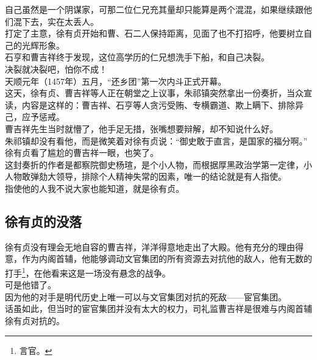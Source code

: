 \begin{multicols}{\theparacolNo}
自己虽然是一个阴谋家，可那二位仁兄充其量却只能算是两个混混，如果继续跟他们混下去，实在太丢人。\\

打定了主意，徐有贞开始和曹、石二人保持距离，见面了也不打招呼，他要树立自己的光辉形象。\\

石亨和曹吉祥终于发现，这位高学历的仁兄想洗手下船，和自己决裂。\\

决裂就决裂吧，怕你不成！\\

天顺元年（1457年）五月，“还乡团”第一次内斗正式开幕。\\

这天，徐有贞、曹吉祥等人正在朝堂之上议事，朱祁镇突然拿出一份奏折，当众宣读，内容是这样的：曹吉祥、石亨等人贪污受贿、专横霸道、欺上瞒下、排除异己，应予惩戒。\\

曹吉祥先生当时就懵了，他手足无措，张嘴想要辩解，却不知说什么好。\\

朱祁镇却没有看他，而是微笑着对徐有贞说：“御史敢于直言，是国家的福分啊。”\\

徐有贞看了尴尬的曹吉祥一眼，也笑了。\\

这封奏折的作者是都察院御史杨瑄，是个小人物，而根据厚黑政治学第一定律，小人物敢弹劾大领导，排除个人精神失常的因素，唯一的结论就是有人指使。\\

指使他的人我不说大家也能知道，就是徐有贞。\\

\subsection{徐有贞的没落}
徐有贞没有理会无地自容的曹吉祥，洋洋得意地走出了大殿。他有充分的理由得意，作为内阁首辅，他能够调动文官集团的所有资源去对抗他的敌人，他有无数的打手\footnote{言官。}，在他看来这是一场没有悬念的战争。\\

可是他错了。\\

因为他的对手是明代历史上唯一可以与文官集团对抗的死敌——宦官集团。\\

话虽如此，但当时的宦官集团并没有太大的权力，司礼监曹吉祥是很难与内阁首辅徐有贞对抗的。\\


\end{multicols}
